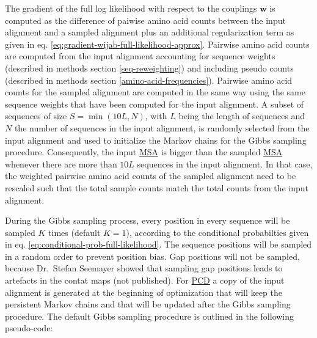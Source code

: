 \documentclass[11pt,a4paper,twoside]{book}
\newcommand{\eq}{\!=\!}
\newcommand{\w}{\mathbf{w}}
\theoremstyle{definition}
\theoremstyle{definition}
\theoremstyle{remark}
\begin{document}
The gradient of the full log likelihood with respect to the couplings
\(\w\) is computed as the difference of paiwise amino acid counts
between the input alignment and a sampled alignment plus an additional
regularization term as given in eq.
\eqref{eq:gradient-wijab-full-likelihood-approx}. Pairwise amino acid
counts are computed from the input alignment accounting for sequence
weights (described in methods section \ref{seq-reweighting}) and
including pseudo counts (described in methods section
\ref{amino-acid-frequencies}). Pairwise amino acid counts for the
sampled alignment are computed in the same way using the same sequence
weights that have been computed for the input alignment. A subset of
sequences of size \(S \eq \min(10L, N)\), with \(L\) being the length of
sequences and \(N\) the number of sequences in the input alignment, is
randomly selected from the input alignment and used to initialize the
Markov chains for the Gibbs sampling procedure. Consequently, the input
\protect\hyperlink{abbrev}{MSA} is bigger than the sampled
\protect\hyperlink{abbrev}{MSA} whenever there are more than \(10L\)
sequences in the input alignment. In that case, the weighted pairwise
amino acid counts of the sampled alignment need to be rescaled such that
the total sample counts match the total counts from the input alignment.

During the Gibbs sampling process, every position in every sequence will
be sampled \(K\) times (default \(K\eq1\)), according to the conditional
probabilties given in eq. \eqref{eq:conditional-prob-full-likelihood}. The
sequence positions will be sampled in a random order to prevent position
bias. Gap positions will not be sampled, because Dr.~Stefan Seemayer
showed that sampling gap positions leads to artefacts in the contat maps
(not published). For \protect\hyperlink{abbrev}{PCD} a copy of the input
alignment is generated at the beginning of optimization that will keep
the persistent Markov chains and that will be updated after the Gibbs
sampling procedure. The default Gibbs sampling procedure is outlined in
the following pseudo-code:
\end{document}
